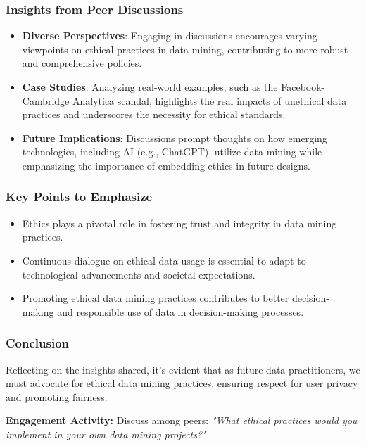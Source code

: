 \documentclass[aspectratio=169]{beamer}
\begin{document}
\begin{frame}[fragile]
    \frametitle{Insights from Peer Discussions}
    \begin{itemize}
        \item \textbf{Diverse Perspectives}: Engaging in discussions encourages varying viewpoints on ethical practices in data mining, contributing to more robust and comprehensive policies.
        \item \textbf{Case Studies}: Analyzing real-world examples, such as the Facebook-Cambridge Analytica scandal, highlights the real impacts of unethical data practices and underscores the necessity for ethical standards.
        \item \textbf{Future Implications}: Discussions prompt thoughts on how emerging technologies, including AI (e.g., ChatGPT), utilize data mining while emphasizing the importance of embedding ethics in future designs.
    \end{itemize}
\end{frame}

\begin{frame}[fragile]
    \frametitle{Key Points to Emphasize}
    \begin{itemize}
        \item Ethics plays a pivotal role in fostering trust and integrity in data mining practices.
        \item Continuous dialogue on ethical data usage is essential to adapt to technological advancements and societal expectations.
        \item Promoting ethical data mining practices contributes to better decision-making and responsible use of data in decision-making processes.
    \end{itemize}
\end{frame}

\begin{frame}[fragile]
    \frametitle{Conclusion}
    Reflecting on the insights shared, it’s evident that as future data practitioners, we must advocate for ethical data mining practices, ensuring respect for user privacy and promoting fairness. 

    \vspace{0.5cm}
    \textbf{Engagement Activity:} 
    Discuss among peers: \textit{"What ethical practices would you implement in your own data mining projects?"}

\end{frame}
\end{document}

